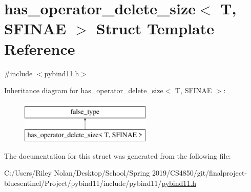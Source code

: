 \hypertarget{structhas__operator__delete__size}{}\section{has\+\_\+operator\+\_\+delete\+\_\+size$<$ T, S\+F\+I\+N\+AE $>$ Struct Template Reference}
\label{structhas__operator__delete__size}


{\ttfamily \#include $<$pybind11.\+h$>$}

Inheritance diagram for has\+\_\+operator\+\_\+delete\+\_\+size$<$ T, S\+F\+I\+N\+AE $>$\+:\begin{figure}[H]
\begin{center}
\leavevmode
\includegraphics[height=2.000000cm]{structhas__operator__delete__size}
\end{center}
\end{figure}


The documentation for this struct was generated from the following file\+:\begin{DoxyCompactItemize}
\item 
C\+:/\+Users/\+Riley Nolan/\+Desktop/\+School/\+Spring 2019/\+C\+S4850/git/finalproject-\/bluesentinel/\+Project/pybind11/include/pybind11/\mbox{\hyperlink{pybind11_8h}{pybind11.\+h}}\end{DoxyCompactItemize}
